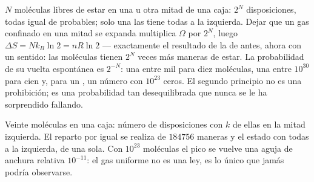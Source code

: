 \begin{example}\label{ex:b1:second-law-entropy:count}
$N$ moléculas libres de estar en una u otra mitad de una caja: $2^N$
disposiciones, todas igual de probables; solo una las tiene todas a la
izquierda. Dejar que un gas confinado en una mitad se expanda multiplica
$\Omega$ por $2^N$, luego $\Delta S =
Nk_B\ln2 = nR\ln2$ --- exactamente el resultado de la 
de antes, ahora con un sentido: las moléculas tienen $2^N$ veces más
maneras de estar. La probabilidad de su vuelta espontánea es $2^{-N}$: una
entre mil para diez moléculas, una entre $10^{30}$ para cien y, para un
, un número con $10^{23}$ ceros. El segundo principio no es una
prohibición; es una probabilidad tan desequilibrada que nunca se le ha
sorprendido fallando.
\end{example}

\begin{omfigure}

{\small Veinte moléculas en una caja: número de disposiciones con $k$ de
ellas en la mitad izquierda. El reparto por igual se realiza de $184756$
maneras y el estado con todas a la izquierda, de una sola. Con $10^{23}$
moléculas el pico se vuelve una aguja de anchura relativa $10^{-11}$: el
gas uniforme no es una ley, es lo único que jamás podría observarse.}
\end{omfigure}

